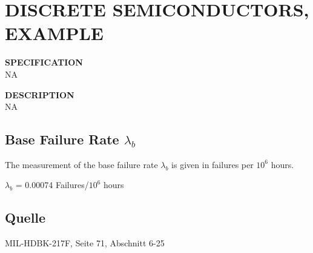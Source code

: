 \section{DISCRETE SEMICONDUCTORS, EXAMPLE}

\begin{minipage}[t]{0.29\textwidth}
    \textbf{SPECIFICATION}\\
    NA
\end{minipage}
\begin{minipage}[t]{0.7\textwidth}
    \textbf{DESCRIPTION}\\
    {\fontsize{12pt}{12pt}\selectfont NA}
\end{minipage}

\subsection{Base Failure Rate $\lambda_b$}
The measurement of the base failure rate $\lambda_b$ is given in failures per $10^6$ hours.
\begin{table}[ht]
{\centering

$\lambda_b$ = 0.00074 Failures/$10^6$ hours



\par}
\subsection*{Quelle}
MIL-HDBK-217F, Seite 71, Abschnitt 6-25
\end{table}